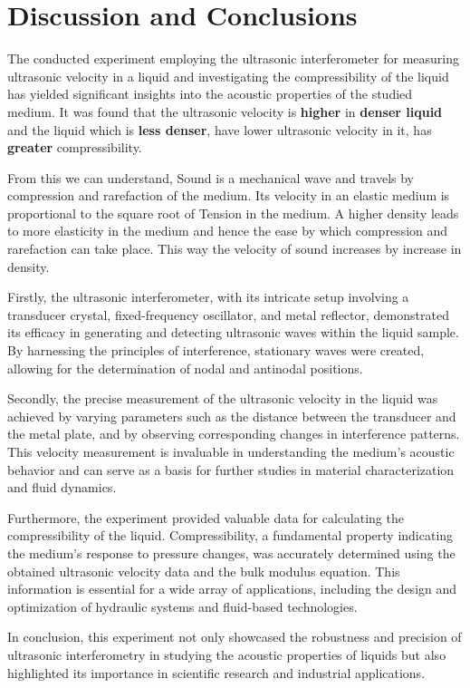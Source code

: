 \chapter{Discussion and Conclusions}%
The conducted experiment employing the ultrasonic interferometer for measuring ultrasonic velocity in a liquid and investigating the compressibility of the liquid has yielded significant insights into the acoustic properties of the studied medium. It was found that the ultrasonic velocity is \textbf{higher} in \textbf{denser liquid} and the liquid which is \textbf{less denser}, have lower ultrasonic velocity in it, has \textbf{greater} compressibility. 

From this we can understand, Sound is a mechanical wave and travels by compression and rarefaction of the medium. Its velocity in an elastic medium is proportional to the square root of Tension in the medium. A higher density leads to more elasticity in the medium and hence the ease by which compression and rarefaction can take place. This way the velocity of sound increases by increase in density.

Firstly, the ultrasonic interferometer, with its intricate setup involving a transducer crystal, fixed-frequency oscillator, and metal reflector, demonstrated its efficacy in generating and detecting ultrasonic waves within the liquid sample. By harnessing the principles of interference, stationary waves were created, allowing for the determination of nodal and antinodal positions.

Secondly, the precise measurement of the ultrasonic velocity in the liquid was achieved by varying parameters such as the distance between the transducer and the metal plate, and by observing corresponding changes in interference patterns. This velocity measurement is invaluable in understanding the medium's acoustic behavior and can serve as a basis for further studies in material characterization and fluid dynamics.

Furthermore, the experiment provided valuable data for calculating the compressibility of the liquid. Compressibility, a fundamental property indicating the medium's response to pressure changes, was accurately determined using the obtained ultrasonic velocity data and the bulk modulus equation. This information is essential for a wide array of applications, including the design and optimization of hydraulic systems and fluid-based technologies.


In conclusion, this experiment not only showcased the robustness and precision of ultrasonic interferometry in studying the acoustic properties of liquids but also highlighted its importance in scientific research and industrial applications.